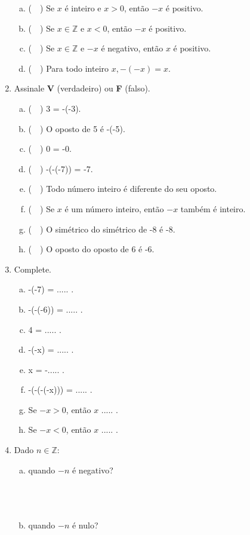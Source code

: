 \documentclass[a4paper,14pt]{article}
\begin{document}
\begin{multicols}{2}
\begin{enumerate}
\begin{enumerate}[a)]
				\item (~~) Se $x$ é inteiro e $x > 0$, então $-x$ é positivo.
				\item (~~) Se $x \in \mathbb{Z}$ e $x < 0$, então $-x$ é positivo.
				\item (~~) Se $x \in \mathbb{Z}$ e $-x$ é negativo, então $x$ é positivo.
				\item (~~) Para todo inteiro $x, -(-x) = x$.
			\end{enumerate}
			\item Assinale \textbf{V} (verdadeiro) ou \textbf{F} (falso).
			\begin{enumerate}[a)] 
				\item (~~) 3 = -(-3).
				\item (~~) O oposto de 5 é -(-5).
				\item (~~) 0 = -0.
				\item (~~) -(-(-7)) = -7.
				\item (~~) Todo número inteiro é diferente do seu oposto.
				\item (~~) Se $x$ é um número inteiro, então $-x$ também é inteiro.
				\item (~~) O simétrico do simétrico de -8 é -8.
				\item (~~) O oposto do oposto de 6 é -6.
			\end{enumerate}
			\item Complete.
			\begin{enumerate}[a)] 
				\item -(-7) = ..... .
				\item -(-(-6)) = ..... .
				\item 4 = ..... .
				\item -(-x) = ..... .
				\item x = -..... .
				\item -(-(-(-x))) = ..... .
				\item Se $-x > 0$, então $x$ ..... .
				\item Se $-x < 0$, então $x$ ..... .
			\end{enumerate}
			\item Dado $n \in \mathbb{Z}$:
			\begin{enumerate}[a)] 
				\item quando $-n$ é negativo? \\\\\\\\
				\item quando $-n$ é nulo? \\\\\\\\

\end{enumerate}
\end{enumerate}
\end{multicols}
\end{document}
